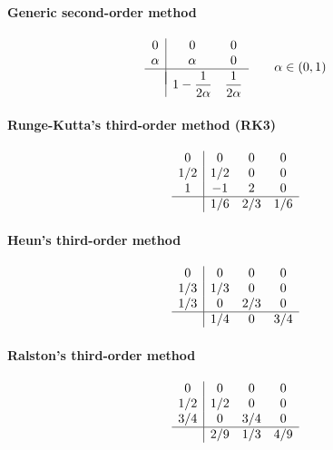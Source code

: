 \paragraph{Generic second-order method}

\begin{equation}
	\begin{array}{c|cc}
		0      & 0      & 0 \\
		\alpha & \alpha & 0 \\ \hline\\[-1em]
		       & 1-\dfrac{1}{2\alpha} & \dfrac{1}{2\alpha}
	\end{array}
	\qquad
	\alpha\in(0,1)
	\label{eq::generic_second}
\end{equation}

\paragraph{Runge-Kutta's third-order method (RK3)}

\begin{equation}
	\begin{array}
	{c|ccc}
		0   &  0  & 0   & 0 \\
		1/2 & 1/2 & 0   & 0 \\
		1   & -1  & 2   & 0 \\ \hline
		    & 1/6 & 2/3 & 1/6
	\end{array}
	\label{eq::RK3}
\end{equation}

\paragraph{Heun's third-order method}

\begin{equation}
	\begin{array}{c|ccc}
		0   & 0   & 0   & 0 \\
		1/3 & 1/3 & 0   & 0 \\
		1/3 & 0   & 2/3 & 0 \\ \hline
		    & 1/4 & 0   & 3/4
	\end{array}
	\label{eq::heun3}
\end{equation}

\paragraph{Ralston's third-order method}

\begin{equation}
	\begin{array}{c|ccc}
		0   & 0   & 0   & 0 \\
		1/2 & 1/2 & 0   & 0 \\
		3/4 & 0   & 3/4 & 0 \\ \hline
		    & 2/9 & 1/3 & 4/9
	\end{array}
	\label{eq::ralston3}
\end{equation}


